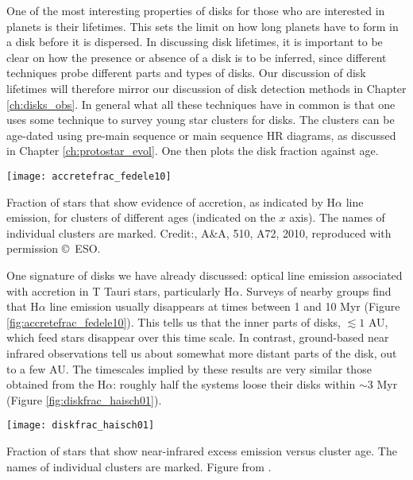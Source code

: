 One of the most interesting properties of disks for those who are interested in planets is their lifetimes. This sets the limit on how long planets have to form in a disk before it is dispersed. In discussing disk lifetimes, it is important to be clear on how the presence or absence of a disk is to be inferred, since different techniques probe different parts and types of disks. Our discussion of disk lifetimes will therefore mirror our discussion of disk detection methods in Chapter \ref{ch:disks_obs}. In general what all these techniques have in common is that one uses some technique to survey young star clusters for disks. The clusters can be age-dated using pre-main sequence or main sequence HR diagrams, as discussed in Chapter \ref{ch:protostar_evol}. One then plots the disk fraction against age.

\begin{marginfigure}
\texttt{[image: accretefrac\_fedele10]}
\caption[Accreting star fraction versus cluster age]{
\label{fig:accretefrac_fedele10}
Fraction of stars that show evidence of accretion, as indicated by H$\alpha$ line emission, for clusters of different ages (indicated on the $x$ axis). The names of individual clusters are marked. Credit:\citeauthor{fedele10a}, A\&A, 510, A72, 2010, reproduced with permission \copyright\, ESO.
}
\end{marginfigure}

One signature of disks we have already discussed: optical line emission associated with accretion in T Tauri stars, particularly H$\alpha$. Surveys of nearby groups find that H$\alpha$ line emission usually disappears at times between 1 and 10 Myr (Figure \ref{fig:accretefrac_fedele10}). This tells us that the inner parts of disks, $\lesssim 1$ AU, which feed stars disappear over this time scale. In contrast, ground-based near infrared observations tell us about somewhat more distant parts of the disk, out to a few AU. The timescales implied by these results are very similar those obtained from the H$\alpha$: roughly half the systems loose their disks within $\sim 3$ Myr (Figure \ref{fig:diskfrac_haisch01}).

\begin{marginfigure}
\texttt{[image: diskfrac\_haisch01]}
\caption[Near infrared excess fraction versus cluster age]{
\label{fig:diskfrac_haisch01}
Fraction of stars that show near-infrared excess emission versus cluster age. The names of individual clusters are marked. Figure from \citet{haisch01a}.
}
\end{marginfigure}

